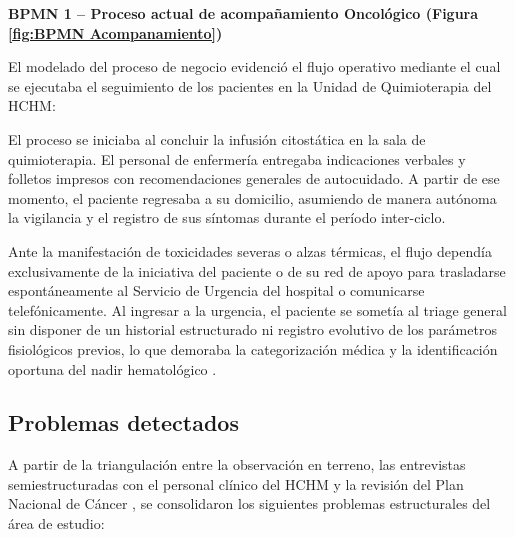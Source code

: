 \noindent
\textbf{BPMN 1 – Proceso actual de acompañamiento Oncológico (Figura \ref{fig:BPMN Acompanamiento})}

\noindent
El modelado del proceso de negocio evidenció el flujo operativo mediante el cual se ejecutaba el seguimiento de los pacientes en la Unidad de Quimioterapia del HCHM:

\noindent
El proceso se iniciaba al concluir la infusión citostática en la sala de quimioterapia. El personal de enfermería entregaba indicaciones verbales y folletos impresos con recomendaciones generales de autocuidado. A partir de ese momento, el paciente regresaba a su domicilio, asumiendo de manera autónoma la vigilancia y el registro de sus síntomas durante el período inter-ciclo.

\noindent
Ante la manifestación de toxicidades severas o alzas térmicas, el flujo dependía exclusivamente de la iniciativa del paciente o de su red de apoyo para trasladarse espontáneamente al Servicio de Urgencia del hospital o comunicarse telefónicamente. Al ingresar a la urgencia, el paciente se sometía al triage general sin disponer de un historial estructurado ni registro evolutivo de los parámetros fisiológicos previos, lo que demoraba la categorización médica y la identificación oportuna del nadir hematológico \parencite{minsal2022plancancer, entrevistaHCHM2026}.

\vspace{0.7cm}

\subsection*{Problemas detectados}
A partir de la triangulación entre la observación en terreno, las entrevistas semiestructuradas con el personal clínico del HCHM \parencite{entrevistaHCHM2026} y la revisión del Plan Nacional de Cáncer \parencite{minsal2022plancancer}, se consolidaron los siguientes problemas estructurales del área de estudio:


